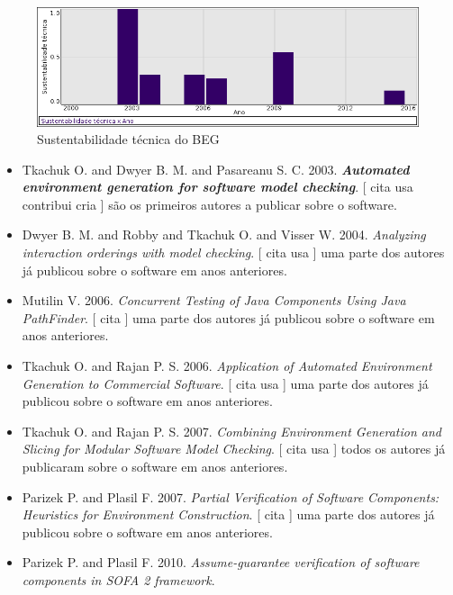 \begin{figure}[h]
  \center
  \includegraphics[scale=0.50]{result-documents/charts/beg.png}
  \caption{Sustentabilidade técnica do BEG}
\end{figure}


\begin{itemize}
\item Tkachuk O. and Dwyer B. M. and Pasareanu S. C.
      2003.
        \textbf{\textit{ Automated environment generation for software model checking}}.
      [
          cita
          usa
          contribui
          cria
      ]
são os primeiros autores a publicar sobre o software.
\item Dwyer B. M. and Robby and Tkachuk O. and Visser W.
      2004.
        \textit{ Analyzing interaction orderings with model checking}.
      [
          cita
          usa
      ]
uma parte dos autores já publicou sobre o software em anos anteriores.
\item Mutilin V.
      2006.
        \textit{ Concurrent Testing of Java Components Using Java PathFinder}.
      [
          cita
      ]
uma parte dos autores já publicou sobre o software em anos anteriores.
\item Tkachuk O. and Rajan P. S.
      2006.
        \textit{ Application of Automated Environment Generation to Commercial Software}.
      [
          cita
          usa
      ]
uma parte dos autores já publicou sobre o software em anos anteriores.
\item Tkachuk O. and Rajan P. S.
      2007.
        \textit{ Combining Environment Generation and Slicing for Modular Software Model Checking}.
      [
          cita
          usa
      ]
todos os autores já publicaram sobre o software em anos anteriores.
\item Parizek P. and Plasil F.
      2007.
        \textit{ Partial Verification of Software Components: Heuristics for Environment Construction}.
      [
          cita
      ]
uma parte dos autores já publicou sobre o software em anos anteriores.
\item Parizek P. and Plasil F.
      2010.
        \textit{ Assume-guarantee verification of software components in SOFA 2 framework}.

\end{itemize}
